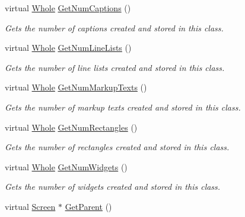 \begin{DoxyCompactItemize}
virtual \hyperlink{namespacephys_a460f6bc24c8dd347b05e0366ae34f34a}{Whole} \hyperlink{classphys_1_1UI_1_1Layer_a0e8df4319db95b3573c53b041686e66b}{GetNumCaptions} ()
\begin{DoxyCompactList}\small\item\em Gets the number of captions created and stored in this class. \item\end{DoxyCompactList}\item 
virtual \hyperlink{namespacephys_a460f6bc24c8dd347b05e0366ae34f34a}{Whole} \hyperlink{classphys_1_1UI_1_1Layer_aa25225bb0011d26038959420153d9714}{GetNumLineLists} ()
\begin{DoxyCompactList}\small\item\em Gets the number of line lists created and stored in this class. \item\end{DoxyCompactList}\item 
virtual \hyperlink{namespacephys_a460f6bc24c8dd347b05e0366ae34f34a}{Whole} \hyperlink{classphys_1_1UI_1_1Layer_acc0fbbeabb701ad86826312b2ce88d60}{GetNumMarkupTexts} ()
\begin{DoxyCompactList}\small\item\em Gets the number of markup texts created and stored in this class. \item\end{DoxyCompactList}\item 
virtual \hyperlink{namespacephys_a460f6bc24c8dd347b05e0366ae34f34a}{Whole} \hyperlink{classphys_1_1UI_1_1Layer_a1a006c096c7eb87669f00cb6a385567e}{GetNumRectangles} ()
\begin{DoxyCompactList}\small\item\em Gets the number of rectangles created and stored in this class. \item\end{DoxyCompactList}\item 
virtual \hyperlink{namespacephys_a460f6bc24c8dd347b05e0366ae34f34a}{Whole} \hyperlink{classphys_1_1UI_1_1Layer_a9501026d0546e37f2f7989a555f47500}{GetNumWidgets} ()
\begin{DoxyCompactList}\small\item\em Gets the number of widgets created and stored in this class. \item\end{DoxyCompactList}\item 
virtual \hyperlink{classphys_1_1UI_1_1Screen}{Screen} $\ast$ \hyperlink{classphys_1_1UI_1_1Layer_a484d10cf74177dea47d00ad7ddef8527}{GetParent} ()

\end{DoxyCompactItemize}
